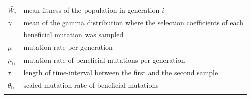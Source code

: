 \documentclass[a4paper, 12pt]{article}
\begin{document}
\begin{table}[ht]
\begin{tabular}{ll}
    $\bar{W_{i}}$           & mean fitness of the population in generation $i$\\
    $\gamma$                & mean of the gamma distribution where the selection coefficients of each\\
                            & beneficial mutation was sampled\\
    $\mu$                   & mutation rate per generation\\
    $\mu_{\mathrm{b}}$      & mutation rate of beneficial mutations per generation\\
    $\tau$                  & length of time-interval between the first and the second sample\\
    $\theta_{\mathrm{b}}$   & scaled mutation rate of beneficial mutations\\
&\\
    
    \bottomrule
  \end{tabular}
  \label{tab:supple_symbols}
\end{table}
\end{document}
